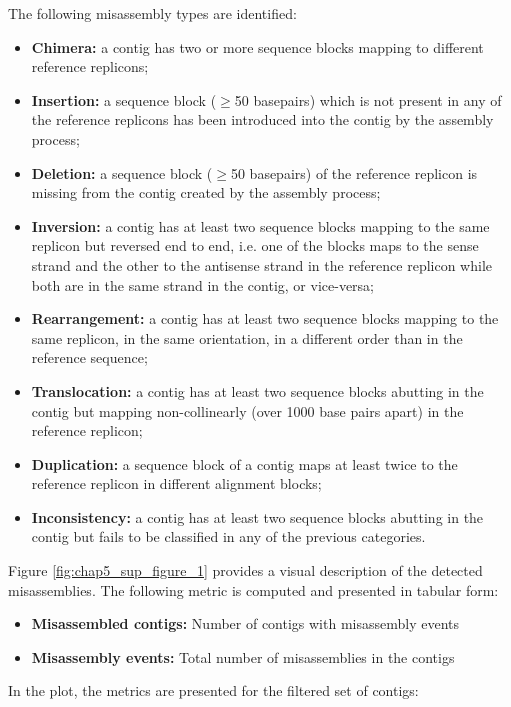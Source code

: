 The following misassembly types are identified:

\begin{itemize}
    \item \textbf{Chimera:} a contig has two or more sequence blocks mapping to different reference replicons;
    \item \textbf{Insertion:} a sequence block ($\geq $50 basepairs) which is not present in any of the reference replicons has been introduced into the contig by the assembly process;
    \item \textbf{Deletion:} a sequence block ($\geq $50 basepairs) of the reference replicon is missing from the contig created by the assembly process;
    \item \textbf{Inversion:} a contig has at least two sequence blocks mapping to the same replicon but reversed end to end, i.e. one of the blocks maps to the sense strand and the other to the antisense strand in the reference replicon while both are in the same strand in the contig, or vice-versa;
    \item \textbf{Rearrangement:} a contig has at least two sequence blocks mapping to the same replicon, in the same orientation, in a different order than in the reference sequence;
    \item \textbf{Translocation:} a contig has at least two sequence blocks abutting in the contig but mapping non-collinearly (over 1000 base pairs apart) in the reference replicon;
    \item \textbf{Duplication:} a sequence block of a contig maps at least twice to the reference replicon in different alignment blocks;
    \item \textbf{Inconsistency:} a contig has at least two sequence blocks abutting in the contig but fails to be classified in any of the previous categories.
\end{itemize}

Figure \ref{fig:chap5_sup_figure_1} provides a visual description of the detected misassemblies. The following metric is computed and presented in tabular form:

\begin{itemize}
    \item \textbf{Misassembled contigs:} Number of contigs with misassembly events
    \item \textbf{Misassembly events:} Total number of misassemblies in the contigs
\end{itemize}

In the plot, the metrics are presented for the filtered set of contigs:

